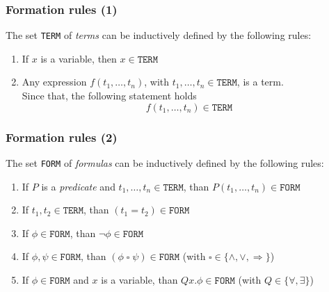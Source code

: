 \documentclass{beamer}
\begin{document}
                \begin{frame}
                    \frametitle{Formation rules (1)}
                    \begin{definition}
                        The set \texttt{TERM} of \textit{terms} can be inductively defined by the following rules:
                        \begin{enumerate}
                            \item If $ x $ is a variable, then $ x \in \texttt{TERM}$
                            \item Any expression $ f(t_1, \dots, t_n) $, with $ t_1, \dots, t_n \in \texttt{TERM} $, is a term.\\
                            Since that, the following statement holds
                            \[
                                f(t_1, \dots, t_n) \in \texttt{TERM}
                            \]
                        \end{enumerate}
                    \end{definition}
                \end{frame}

                \begin{frame}
                    \frametitle{Formation rules (2)}
                    \begin{definition}
                        The set \texttt{FORM} of \textit{formulas} can be inductively defined by the following rules:
                        \begin{enumerate}
                            \item If $ P $ is a \textit{predicate} and $ t_1, \dots, t_n \in \texttt{TERM} $, than $ P(t_1, \dots, t_n) \in \texttt{FORM} $
                            \item If $ t_1, t_2 \in \texttt{TERM} $, than $ (t_1 = t_2) \in \texttt{FORM} $
                            \item If $ \phi \in \texttt{FORM} $, than $ \neg \phi \in \texttt{FORM} $
                            \item If $ \phi, \psi \in \texttt{FORM} $, than $ (\phi\; \square\; \psi) \in \texttt{FORM} $ (with $ \square \in \{ \wedge, \vee, \Rightarrow \} $)
                            \item If $ \phi \in \texttt{FORM} $ and $ x $ is a variable, than $ Qx.\phi \in \texttt{FORM} $ (with $ Q \in \{ \forall, \exists \} $)
                        \end{enumerate}
                    \end{definition}
                \end{frame}
\end{document}
